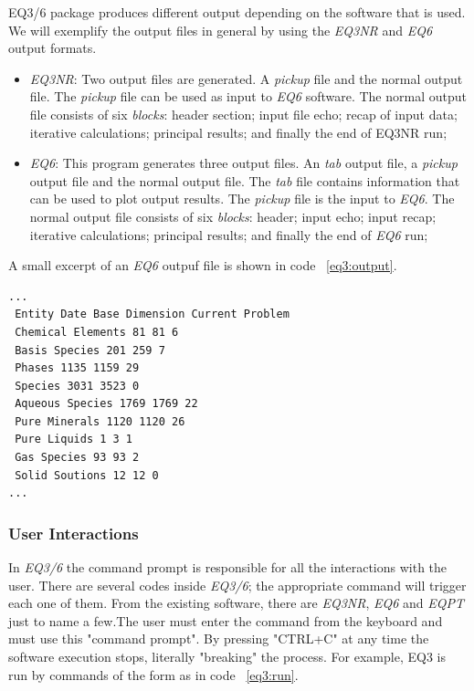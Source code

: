 \documentclass[ppgc,mestrado,English]{iiufrgs}
\begin{document}
EQ3/6 package produces different output depending on the software that is used. We will exemplify the output files in general by using the \emph{EQ3NR} and \emph{EQ6} output formats. 
\begin{itemize}
\item \emph{EQ3NR}: Two output files are generated. A \emph{pickup} file and the normal output file. The \emph{pickup} file can be used as input to \emph{EQ6} software. The normal output file consists of six \emph{blocks}: header section; input file echo; recap of input data; iterative calculations; principal results; and finally the end of EQ3NR run;
\item \emph{EQ6}: This program generates three output files. An \emph{tab} output file, a \emph{pickup} output file and the normal output file. The \emph{tab} file contains information that can be used to plot output results. The \emph{pickup} file is the input to \emph{EQ6}. The normal output file consists of six \emph{blocks}: header; input echo; input recap; iterative calculations; principal results; and finally the end of \emph{EQ6} run;
\end{itemize}

A small excerpt of an \emph{EQ6} outpuf file is shown in code ~\ref{eq3:output}.

\begin{minipage}[c]{0.93\textwidth}
\begin{lstlisting}[frame=single, caption=Excerpt of \emph{EQ6} output file, label=eq3:output]
...
 Entity Date Base Dimension Current Problem
 Chemical Elements 81 81 6
 Basis Species 201 259 7
 Phases 1135 1159 29
 Species 3031 3523 0
 Aqueous Species 1769 1769 22
 Pure Minerals 1120 1120 26
 Pure Liquids 1 3 1
 Gas Species 93 93 2
 Solid Soutions 12 12 0
...
\end{lstlisting}
\end{minipage}

\subsubsection{User Interactions}
In \emph{EQ3/6} the command prompt is responsible for all the interactions with the user. There are several codes inside \emph{EQ3/6}; the appropriate command will trigger each one of them. From the existing software, there are \emph{EQ3NR}, \emph{EQ6} and \emph{EQPT} just to name a few.The user must enter the command from the keyboard and must use this "command prompt". By pressing "CTRL+C" at any time the software execution stops, literally "breaking" the process. For example, EQ3 is run by commands of the form as in code ~\ref{eq3:run}.
\end{document}

